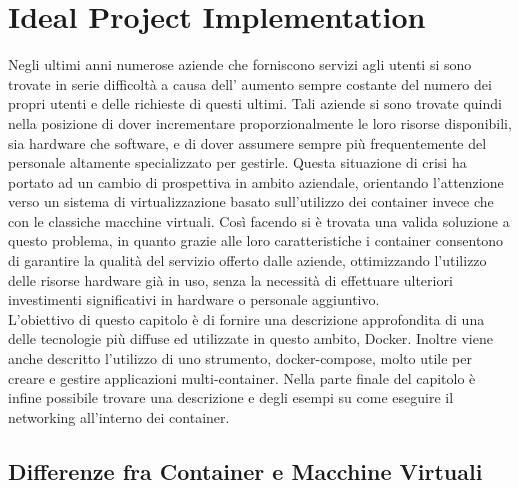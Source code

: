 

\chapter{Ideal Project Implementation} \label{ch:IdealProjectImplementation}


Negli ultimi anni numerose aziende che forniscono servizi agli utenti si sono trovate in serie difficoltà a causa dell' aumento sempre costante del numero
dei propri utenti e delle richieste di questi ultimi. Tali aziende si sono trovate quindi nella posizione di dover incrementare proporzionalmente le loro risorse disponibili, sia hardware che software, e di dover
assumere sempre più frequentemente del personale altamente specializzato per gestirle. Questa situazione di crisi ha portato ad un cambio di prospettiva in ambito aziendale, orientando l'attenzione verso un sistema di virtualizzazione
basato sull'utilizzo dei container invece che con le classiche macchine virtuali. Così facendo si è trovata una valida soluzione a questo problema, in quanto grazie alle loro caratteristiche i container consentono di garantire
la qualità del servizio offerto dalle aziende, ottimizzando l'utilizzo delle risorse hardware già in uso, senza la necessità di effettuare ulteriori investimenti significativi in hardware o personale aggiuntivo.\\
L'obiettivo di questo capitolo è di fornire una descrizione approfondita di una delle tecnologie più diffuse ed utilizzate in questo ambito, Docker\cite{docker-docs}. Inoltre viene anche descritto l'utilizzo di uno strumento, docker-compose, molto utile per 
creare e gestire applicazioni multi-container. Nella parte finale del capitolo è infine possibile trovare una descrizione e degli esempi su come eseguire il networking all'interno dei container.

\section{Differenze fra Container e Macchine Virtuali} 

